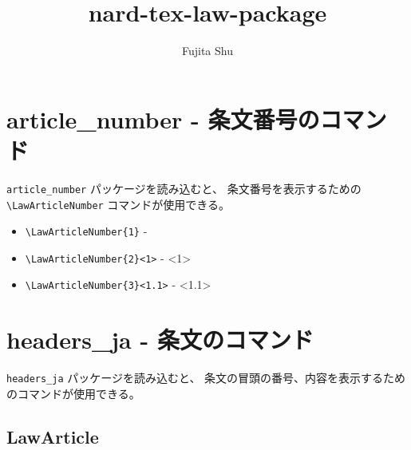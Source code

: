 \documentclass[oneside,10pt,a4paper]{jsarticle}
\title{nard-tex-law-package}
\author{Fujita Shu}
\begin{document}
  \maketitle

  \section{article\_number - 条文番号のコマンド}

  \verb|article_number| パッケージを読み込むと、
  条文番号を表示するための\\
  \verb|\LawArticleNumber| コマンドが使用できる。

  \begin{itemize}
    \item \verb|\LawArticleNumber{1}| - 
    \item \verb|\LawArticleNumber{2}<1>| - <1>
    \item \verb|\LawArticleNumber{3}<1.1>| - <1.1>
  \end{itemize}

  \newpage

  \section{headers\_ja - 条文のコマンド}

  \verb|headers_ja| パッケージを読み込むと、
  条文の冒頭の番号、内容を表示するためのコマンドが使用できる。

  \subsection{LawArticle}
\end{document}
